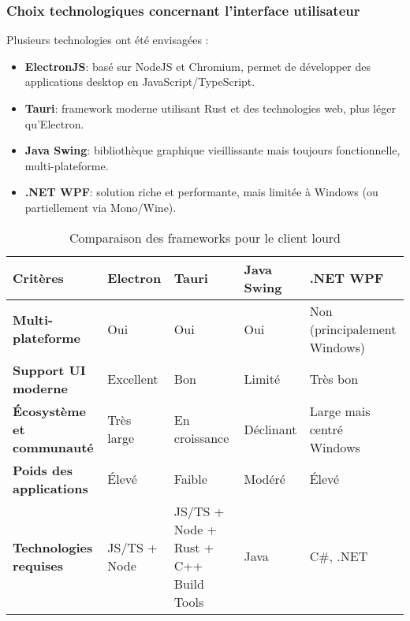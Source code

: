 \subsubsection{Choix technologiques concernant l'interface utilisateur} \label{sec:choix_client}
Plusieurs technologies ont été envisagées :
\begin{itemize}
    \item \textbf{ElectronJS}: basé sur NodeJS et Chromium, permet de développer des applications desktop en JavaScript/TypeScript.
    \item \textbf{Tauri}: framework moderne utilisant Rust et des technologies web, plus léger qu’Electron.
    \item \textbf{Java Swing}: bibliothèque graphique vieillissante mais toujours fonctionnelle, multi-plateforme.
    \item \textbf{.NET WPF}: solution riche et performante, mais limitée à Windows (ou partiellement via Mono/Wine).
\end{itemize}

\begin{longtable}[h!]{|p{}|p{}|p{}|p{}|p{}|}
\caption{\label{tab:comparison_clients} Comparaison des frameworks pour le client lourd} \\

\hline
\textbf{Critères} & \textbf{Electron} & \textbf{Tauri} & \textbf{Java Swing} & \textbf{.NET WPF} \\
\endfirsthead

\hline
\textbf{Multi-plateforme} & Oui & Oui & Oui & Non (principalement Windows) \\
\hline
\textbf{Support UI moderne} & Excellent & Bon & Limité & Très bon \\
\hline
\textbf{Écosystème et communauté} & Très large & En croissance & Déclinant & Large mais centré Windows \\
\hline
\textbf{Poids des applications} & Élevé & Faible & Modéré & Élevé \\
\hline
\textbf{Technologies requises} & JS/TS + Node & JS/TS + Node + Rust + C++ Build Tools & Java & C\#, .NET \\
\hline
\end{longtable}
